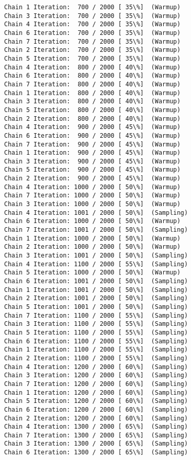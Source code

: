 \documentclass[11pt]{article}
\begin{document}
\begin{Verbatim}[commandchars=\\\{\}]
Chain 1 Iteration:  700 / 2000 [ 35\%]  (Warmup)
Chain 3 Iteration:  700 / 2000 [ 35\%]  (Warmup)
Chain 4 Iteration:  700 / 2000 [ 35\%]  (Warmup)
Chain 6 Iteration:  700 / 2000 [ 35\%]  (Warmup)
Chain 7 Iteration:  700 / 2000 [ 35\%]  (Warmup)
Chain 2 Iteration:  700 / 2000 [ 35\%]  (Warmup)
Chain 5 Iteration:  700 / 2000 [ 35\%]  (Warmup)
Chain 4 Iteration:  800 / 2000 [ 40\%]  (Warmup)
Chain 6 Iteration:  800 / 2000 [ 40\%]  (Warmup)
Chain 7 Iteration:  800 / 2000 [ 40\%]  (Warmup)
Chain 1 Iteration:  800 / 2000 [ 40\%]  (Warmup)
Chain 3 Iteration:  800 / 2000 [ 40\%]  (Warmup)
Chain 5 Iteration:  800 / 2000 [ 40\%]  (Warmup)
Chain 2 Iteration:  800 / 2000 [ 40\%]  (Warmup)
Chain 4 Iteration:  900 / 2000 [ 45\%]  (Warmup)
Chain 6 Iteration:  900 / 2000 [ 45\%]  (Warmup)
Chain 7 Iteration:  900 / 2000 [ 45\%]  (Warmup)
Chain 1 Iteration:  900 / 2000 [ 45\%]  (Warmup)
Chain 3 Iteration:  900 / 2000 [ 45\%]  (Warmup)
Chain 5 Iteration:  900 / 2000 [ 45\%]  (Warmup)
Chain 2 Iteration:  900 / 2000 [ 45\%]  (Warmup)
Chain 4 Iteration: 1000 / 2000 [ 50\%]  (Warmup)
Chain 7 Iteration: 1000 / 2000 [ 50\%]  (Warmup)
Chain 3 Iteration: 1000 / 2000 [ 50\%]  (Warmup)
Chain 4 Iteration: 1001 / 2000 [ 50\%]  (Sampling)
Chain 6 Iteration: 1000 / 2000 [ 50\%]  (Warmup)
Chain 7 Iteration: 1001 / 2000 [ 50\%]  (Sampling)
Chain 1 Iteration: 1000 / 2000 [ 50\%]  (Warmup)
Chain 2 Iteration: 1000 / 2000 [ 50\%]  (Warmup)
Chain 3 Iteration: 1001 / 2000 [ 50\%]  (Sampling)
Chain 4 Iteration: 1100 / 2000 [ 55\%]  (Sampling)
Chain 5 Iteration: 1000 / 2000 [ 50\%]  (Warmup)
Chain 6 Iteration: 1001 / 2000 [ 50\%]  (Sampling)
Chain 1 Iteration: 1001 / 2000 [ 50\%]  (Sampling)
Chain 2 Iteration: 1001 / 2000 [ 50\%]  (Sampling)
Chain 5 Iteration: 1001 / 2000 [ 50\%]  (Sampling)
Chain 7 Iteration: 1100 / 2000 [ 55\%]  (Sampling)
Chain 3 Iteration: 1100 / 2000 [ 55\%]  (Sampling)
Chain 5 Iteration: 1100 / 2000 [ 55\%]  (Sampling)
Chain 6 Iteration: 1100 / 2000 [ 55\%]  (Sampling)
Chain 1 Iteration: 1100 / 2000 [ 55\%]  (Sampling)
Chain 2 Iteration: 1100 / 2000 [ 55\%]  (Sampling)
Chain 4 Iteration: 1200 / 2000 [ 60\%]  (Sampling)
Chain 3 Iteration: 1200 / 2000 [ 60\%]  (Sampling)
Chain 7 Iteration: 1200 / 2000 [ 60\%]  (Sampling)
Chain 1 Iteration: 1200 / 2000 [ 60\%]  (Sampling)
Chain 5 Iteration: 1200 / 2000 [ 60\%]  (Sampling)
Chain 6 Iteration: 1200 / 2000 [ 60\%]  (Sampling)
Chain 2 Iteration: 1200 / 2000 [ 60\%]  (Sampling)
Chain 4 Iteration: 1300 / 2000 [ 65\%]  (Sampling)
Chain 7 Iteration: 1300 / 2000 [ 65\%]  (Sampling)
Chain 3 Iteration: 1300 / 2000 [ 65\%]  (Sampling)
Chain 6 Iteration: 1300 / 2000 [ 65\%]  (Sampling)

\end{Verbatim}
\end{document}
